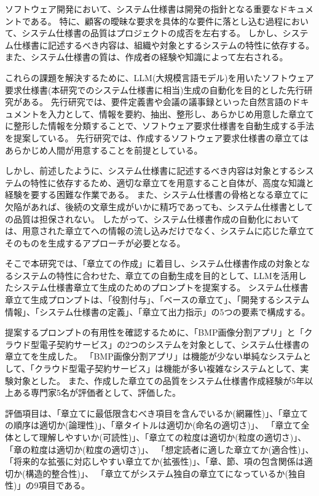 \documentclass[uplatex, 10pt, a4j, dvipdfmx]{jsarticle}
\begin{document}
\AbstractHeader
\begin{AbstractBody}
\fi

ソフトウェア開発において、システム仕様書は開発の指針となる重要なドキュメントである。
特に、顧客の曖昧な要求を具体的な要件に落とし込む過程において、システム仕様書の品質はプロジェクトの成否を左右する。
しかし、システム仕様書に記述するべき内容は、組織や対象とするシステムの特性に依存する。
また、システム仕様書の質は、作成者の経験や知識によって左右される。

これらの課題を解決するために、LLM(大規模言語モデル)を用いたソフトウェア要求仕様書(本研究でのシステム仕様書に相当)生成の自動化を目的とした先行研究がある。
先行研究では、要件定義書や会議の議事録といった自然言語のドキュメントを入力として、情報を要約、抽出、整形し、あらかじめ用意した章立てに整形した情報を分類することで、ソフトウェア要求仕様書を自動生成する手法を提案している。
先行研究では、作成するソフトウェア要求仕様書の章立てはあらかじめ人間が用意することを前提としている。

しかし、前述したように、システム仕様書に記述するべき内容は対象とするシステムの特性に依存するため、適切な章立てを用意すること自体が、高度な知識と経験を要する困難な作業である。
また、システム仕様書の骨格となる章立てに欠陥があれば、後続の文章生成がいかに精巧であっても、システム仕様書としての品質は担保されない。
したがって、システム仕様書作成の自動化においては、用意された章立てへの情報の流し込みだけでなく、システムに応じた章立てそのものを生成するアプローチが必要となる。

そこで本研究では、「章立ての作成」に着目し、システム仕様書作成の対象となるシステムの特性に合わせた、章立ての自動生成を目的として、LLMを活用したシステム仕様書章立て生成のためのプロンプトを提案する。
システム仕様書章立て生成プロンプトは、「役割付与」、「ベースの章立て」、「開発するシステム情報」、「システム仕様書の定義」、「章立て出力指示」の5つの要素で構成する。

提案するプロンプトの有用性を確認するために、「BMP画像分割アプリ」と「クラウド型電子契約サービス」の2つのシステムを対象として、システム仕様書の章立てを生成した。
「BMP画像分割アプリ」は機能が少ない単純なシステムとして、「クラウド型電子契約サービス」は機能が多い複雑なシステムとして、実験対象とした。
また、作成した章立ての品質をシステム仕様書作成経験が5年以上ある専門家5名が評価者として、評価した。

評価項目は、「章立てに最低限含むべき項目を含んでいるか(網羅性)」、「章立ての順序は適切か(論理性)」、「章タイトルは適切か(命名の適切さ)」、
「章立て全体として理解しやすいか(可読性)」、「章立ての粒度は適切か(粒度の適切さ)」、「章の粒度は適切か(粒度の適切さ)」、
「想定読者に適した章立てか(適合性)」、「将来的な拡張に対応しやすい章立てか(拡張性)」、「章、節、項の包含関係は適切か(構造的整合性)」、
「章立てがシステム独自の章立てになっているか(独自性)」の9項目である。


\end{AbstractBody}
\end{document}
